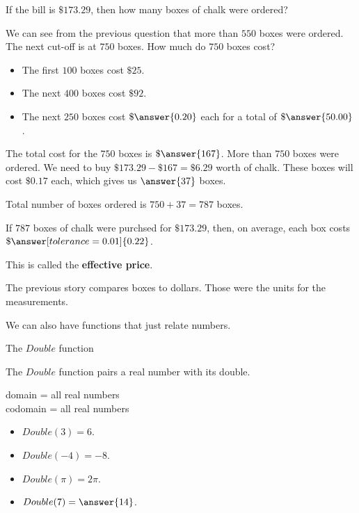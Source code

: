 \documentclass{ximera}
\begin{document}
\begin{question}

If the bill is $\$173.29$, then how many boxes of chalk were ordered?



We can see from the previous question that more than $550$ boxes were ordered.  The next cut-off is at $750$ boxes.  How much do $750$ boxes cost? 

\begin{itemize}
\item The first $100$ boxes cost $\$25$.
\item The next $400$ boxes cost $\$92$.
\item The next $250$ boxes cost $\$\answer{0.20}$ each for a total of $\$\answer{50.00}$.
\end{itemize}

The total cost for the $750$ boxes is $\$\answer{167}$. More than $750$ boxes were ordered.  We need to buy $\$173.29 - \$167 = \$6.29$ worth of chalk.  These boxes will cost $\$0.17$ each, which gives us $\answer{37}$ boxes.  


Total number of boxes ordered is $750 + 37 = 787$ boxes.



\end{question}



\begin{question}

If $787$ boxes of chalk were purchsed for $\$173.29$, then, on average, each box costs $\$\answer[tolerance=0.01]{0.22}$. 

This is called the \textbf{effective price}.
\end{question}



The previous story compares boxes to dollars.  Those were the units for the measurements. 



We can also have functions that just relate numbers. 







\begin{example} The $Double$ function

The $Double$ function pairs a real number with its double.


domain = all real numbers  \\
codomain = all real numbers


\begin{itemize}
\item $Double(3) = 6$.
\item $Double(-4) = -8$.
\item $Double(\pi) = 2 \pi$.

\item $Double(7) = \answer{14}$.
\end{itemize}

\end{example} 
\end{document}
